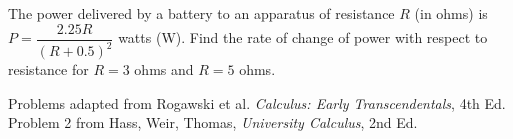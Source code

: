 \documentclass{ximera}
\begin{document}
\begin{exercise}
    The power delivered by a battery to an apparatus of resistance $R$ (in ohms) is $P=\dfrac{2.25R}{(R+0.5)^2}$ watts (W).  Find the rate of change of power with respect to resistance for $R=3$ ohms and $R=5$ ohms.
\end{exercise}

Problems adapted from Rogawski et al. \textit{Calculus: Early Transcendentals}, 4th Ed.  Problem 2 from Hass, Weir, Thomas, \textit{University Calculus}, 2nd Ed.
\end{document}

